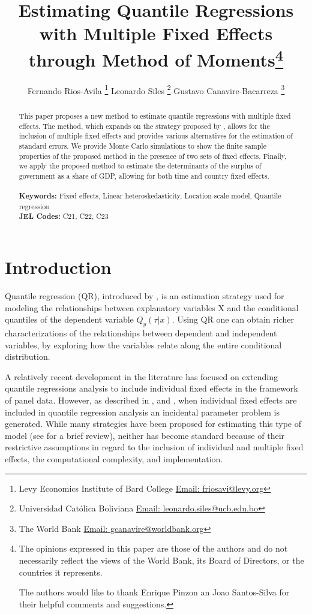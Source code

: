 \documentclass[
  12pt,
  oneside]{article}
\title{\textbf{\Large Estimating Quantile Regressions with Multiple
Fixed Effects through Method of Moments}\thanks{The opinions expressed
in this paper are those of the authors and do not necessarily reflect
the views of the World Bank, its Board of Directors, or the countries it
represents.

The authors would like to thank Enrique Pinzon an Joao Santos-Silva for
their helpful comments and suggestions.}}
\author{
Fernando Rios-Avila
\thanks{
      Levy Economics Institute of Bard
College      \href{mailto:friosavi@levy.org}{Email: friosavi@levy.org}
  } \hspace{0.25 cm} 
Leonardo Siles
\thanks{
      Universidad Católica
Boliviana      \href{mailto:leonardo.siles@ucb.edu.bo}{Email: leonardo.siles@ucb.edu.bo}
  } \hspace{0.25 cm} 
Gustavo Canavire-Bacarreza
\thanks{
      The World
Bank      \href{mailto:gcanavire@worldbank.org}{Email: gcanavire@worldbank.org}
  }}
\begin{document}
\maketitle
\begin{abstract}

    This paper proposes a new method to estimate quantile regressions
with multiple fixed effects. The method, which expands on the strategy
proposed by \citet{mss2019}, allows for the inclusion of multiple fixed
effects and provides various alternatives for the estimation of standard
errors. We provide Monte Carlo simulations to show the finite sample
properties of the proposed method in the presence of two sets of fixed
effects. Finally, we apply the proposed method to estimate the
determinants of the surplus of government as a share of GDP, allowing
for both time and country fixed effects. \\ \\
    
    \noindent \textbf{Keywords:} Fixed effects, Linear
heteroskedasticity, Location-scale model, Quantile regression \\
    \noindent \textbf{JEL Codes:} C21, C22, C23  
    
    \end{abstract}
    
    \newpage

\newpage{}

\section{Introduction}\label{introduction}

Quantile regression (QR), introduced by \citet{koenkerbasset1978}, is an
estimation strategy used for modeling the relationships between
explanatory variables X and the conditional quantiles of the dependent
variable \(Q_y (\tau|x)\). Using QR one can obtain richer
characterizations of the relationships between dependent and independent
variables, by exploring how the variables relate along the entire
conditional distribution.

A relatively recent development in the literature has focused on
extending quantile regressions analysis to include individual fixed
effects in the framework of panel data. However, as described in
\citet{neymanscott1948}, and \citet{lancaster2000}, when individual
fixed effects are included in quantile regression analysis an incidental
parameter problem is generated. While many strategies have been proposed
for estimating this type of model (see \citet{galvao2017quantile} for a
brief review), neither has become standard because of their restrictive
assumptions in regard to the inclusion of individual and multiple fixed
effects, the computational complexity, and implementation.
\end{document}
